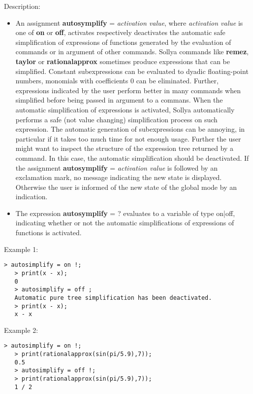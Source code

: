\noindent Description: \begin{itemize}

\item An assignment \textbf{autosymplify} = \emph{activation value}, where \emph{activation value}
   is one of \textbf{on} or \textbf{off}, activates respectively deactivates the
   automatic safe simplification of expressions of functions generated by
   the evaluation of commands or in argument of other commands.
   Sollya commands like \textbf{remez}, \textbf{taylor} or \textbf{rationalapprox} sometimes
   produce expressions that can be simplified. Constant subexpressions
   can be evaluated to dyadic floating-point numbers, monomials with
   coefficients $0$ can be eliminated. Further, expressions
   indicated by the user perform better in many commands when simplified
   before being passed in argument to a commans. When the automatic
   simplification of expressions is activated, Sollya automatically
   performs a safe (not value changing) simplification process on such
   expression.
   The automatic generation of subexpressions can be annoying, in
   particular if it takes too much time for not enough usage. Further the
   user might want to inspect the structure of the expression tree
   returned by a command. In this case, the automatic simplification
   should be deactivated.
   If the assignment \textbf{autosymplify} = \emph{activation value} is followed by an
   exclamation mark, no message indicating the new state is
   displayed. Otherwise the user is informed of the new state of the
   global mode by an indication.

\item The expression \textbf{autosymplify} = ? evaluates to a variable of type
   \textsf{on|off}, indicating whether or not the automatic simplifications
   of expressions of functions is activated.
\end{itemize}
\noindent Example 1: 
\begin{center}\begin{minipage}{14.8cm}\begin{Verbatim}[frame=single]
   > autosimplify = on !;
   > print(x - x);
   0
   > autosimplify = off ;
   Automatic pure tree simplification has been deactivated.
   > print(x - x);
   x - x
\end{Verbatim}
\end{minipage}\end{center}
\noindent Example 2: 
\begin{center}\begin{minipage}{14.8cm}\begin{Verbatim}[frame=single]
   > autosimplify = on !; 
   > print(rationalapprox(sin(pi/5.9),7));
   0.5
   > autosimplify = off !; 
   > print(rationalapprox(sin(pi/5.9),7));
   1 / 2
\end{Verbatim}
\end{minipage}\end{center}
